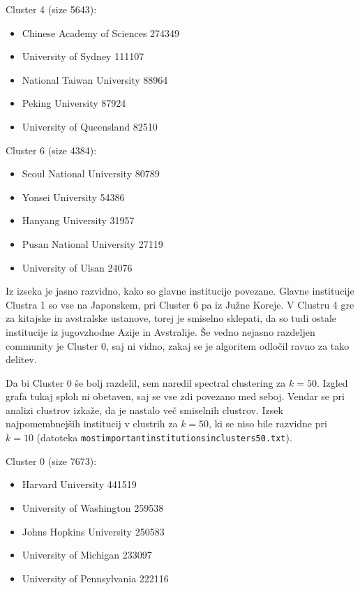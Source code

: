 \documentclass[a4paper,12pt]{article}
\begin{document}
	\hspace{1cm}
	
	Cluster 4 (size 5643):
	\begin{itemize}
		\item Chinese Academy of Sciences 274349
		\item University of Sydney 111107
		\item National Taiwan University 88964
		\item Peking University 87924
		\item University of Queensland 82510
	\end{itemize}

	\hspace{1cm}
	
	Cluster 6 (size 4384):
	\begin{itemize}
		\item Seoul National University 80789
		\item Yonsei University 54386
		\item Hanyang University 31957
		\item Pusan National University 27119
		\item University of Ulsan 24076
	\end{itemize}

	
	Iz izseka je jasno razvidno, kako so glavne institucije povezane. Glavne institucije Clustra 1 so vse na Japonskem, pri Cluster 6 pa iz Južne Koreje. V Clustru 4 gre za kitajske in avstralske ustanove, torej je smiselno sklepati, da so tudi ostale institucije iz jugovzhodne Azije in Avstralije. Še vedno nejasno razdeljen community je Cluster 0, saj ni vidno, zakaj se je algoritem odločil ravno za tako delitev.
	
	Da bi Cluster 0 še bolj razdelil, sem naredil spectral clustering za $k = 50$. Izgled grafa tukaj sploh ni obetaven, saj se vse zdi povezano med seboj. Vendar se pri analizi clustrov izkaže, da je nastalo več smiselnih clustrov. Izsek najpomembnejših institucij v clustrih za $k=50$, ki se niso bile razvidne pri $k=10$ (datoteka \texttt{most\textunderscore important\textunderscore institutions\textunderscore in\textunderscore clusters\textunderscore 50.txt}).
	
	\hspace{1cm}
	
	Cluster 0 (size 7673):
	\begin{itemize}
		\item Harvard University 441519
		\item University of Washington 259538
		\item Johns Hopkins University 250583
		\item University of Michigan 233097
		\item University of Pennsylvania 222116
	\end{itemize}
	
\end{document}
